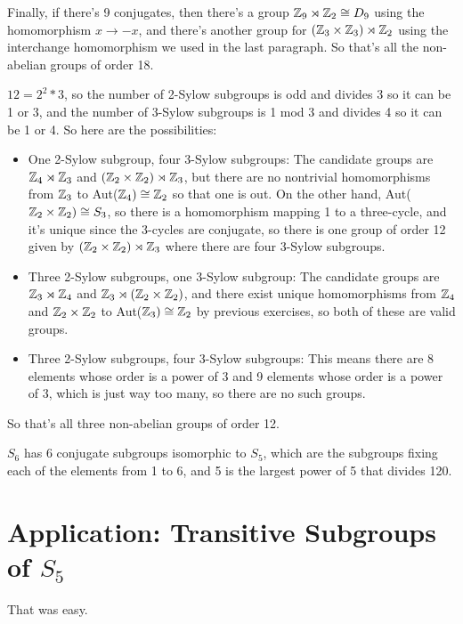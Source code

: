 \documentclass[11pt, oneside]{article}   	%
\begin{document}
Finally, if there's 9 conjugates, then there's a group $\mathbb{Z}_9 \rtimes \mathbb{Z}_2 \cong D_9$ using the homomorphism $x \to -x$, and there's another group for $(\mathbb{Z}_3 \times \mathbb{Z}_3) \rtimes \mathbb{Z}_2$ using the interchange homomorphism we used in the last paragraph. So that's all the non-abelian groups of order 18.
\item $12 = 2^2 * 3$, so the number of 2-Sylow subgroups is odd and divides 3 so it can be 1 or 3, and the number of 3-Sylow subgroups is 1 mod 3 and divides 4 so it can be 1 or 4. So here are the possibilities: \begin{itemize}
\item One 2-Sylow subgroup, four 3-Sylow subgroups: The candidate groups are $\mathbb{Z}_4 \rtimes \mathbb{Z}_3$ and $(\mathbb{Z}_2 \times \mathbb{Z}_2) \rtimes \mathbb{Z}_3$, but there are no nontrivial homomorphisms from $\mathbb{Z}_3$ to Aut($\mathbb{Z}_4) \cong \mathbb{Z}_2$ so that one is out. On the other hand, Aut($\mathbb{Z}_2 \times \mathbb{Z}_2) \cong S_3$, so there is a homomorphism mapping 1 to a three-cycle, and it's unique since the 3-cycles are conjugate, so there is one group of order 12 given by $(\mathbb{Z}_2 \times \mathbb{Z}_2) \rtimes \mathbb{Z}_3$ where there are four 3-Sylow subgroups.
\item Three 2-Sylow subgroups, one 3-Sylow subgroup: The candidate groups are $\mathbb{Z}_3 \rtimes \mathbb{Z}_4$ and $\mathbb{Z}_3 \rtimes(\mathbb{Z}_2 \times \mathbb{Z}_2)$, and there exist unique homomorphisms from $\mathbb{Z}_4$ and $\mathbb{Z}_2 \times \mathbb{Z}_2$ to Aut($\mathbb{Z}_3) \cong \mathbb{Z}_2$ by previous exercises, so both of these are valid groups.
\item Three 2-Sylow subgroups, four 3-Sylow subgroups: This means there are 8 elements whose order is a power of 3 and 9 elements whose order is a power of 3, which is just way too many, so there are no such groups.
\end{itemize}
So that's all three non-abelian groups of order 12.
\item $S_6$ has 6 conjugate subgroups isomorphic to $S_5$, which are the subgroups fixing each of the elements from 1 to 6, and 5 is the largest power of 5 that divides 120.
\ee
\section{Application: Transitive Subgroups of $S_5$}
That was easy.
\end{document}
